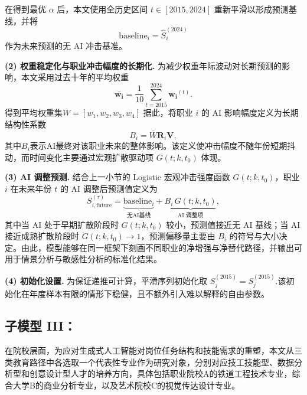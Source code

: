 \documentclass{mcmthesis}
\begin{document}
在得到最优 $\alpha$ 后，本文使用全历史区间 $t\in[2015,2024]$ 重新平滑以形成预测基线，并将
\begin{equation}
\mathrm{baseline}_{i}=\widehat{S}_i^{(2024)}
\end{equation}
作为未来预测的无 AI 冲击基准。

\noindent \textbf{(2) 权重稳定化与职业冲击幅度的长期化.}
为减少权重年际波动对长期预测的影响，本文采用过去十年的平均权重
\begin{equation}
\bar{\mathbf{w_i}}=\frac{1}{10}\sum_{t=2015}^{2024}\mathbf{w_i}^{(t)}.
\label{eq:wbar}
\end{equation}
得到平均权重集$\overline{W}=[w_1,w_2,w_3,w_4]$
据此，将职业 $i$ 的 AI 影响幅度定义为长期结构性系数
\begin{equation}
B_i={\overline{W}}\mathbf{R}_i\mathbf{V},
\label{eq:B_longrun}
\end{equation}
其中$B_i$表示AI最终对该职业未来的整体影响。该定义使冲击幅度不随年份短期抖动，而时间变化主要通过宏观扩散驱动项 $G(t;k,t_0)$ 体现。

\noindent \textbf{(3) AI 调整预测.}
结合上一小节的 Logistic 宏观冲击强度函数 $G(t;k,t_0)$，职业 $i$ 在未来年份 $t$ 的 AI 调整后预测值定义为
\begin{equation}
S_{i,\mathrm{future}}^{(\tau)}
=\underbrace{\mathrm{baseline}_{i}}_{\text{无AI基线}}
+\underbrace{B_i\,G(t;k,t_0)}_{\text{AI 调整项}},
\label{eq:ai_adjusted_forecast_cn}
\end{equation}
其中当 AI 处于早期扩散阶段时 $G(t;k,t_0)$ 较小，预测值接近无 AI 基线；当 AI 接近成熟扩散阶段时 $G(t;k,t_0)\to 1$，预测偏移量主要由 $B_i$ 的符号与大小决定。由此，模型能够在同一框架下刻画不同职业的净增强与净替代路径，并输出可用于情景分析与敏感性分析的标准化结果。

\noindent \textbf{(4) 初始化设置.}
为保证递推可计算，平滑序列初始化取
${S}_j^{(2015)}=S_j^{(2015)}.$该初始化在年度样本有限的情形下稳健，且不额外引入难以解释的自由参数。



\subsection{子模型 III：}
\noindent
在院校层面，为应对生成式人工智能对岗位任务结构和技能需求的重塑，本文从三类教育路径中各选取一个代表性专业作为研究对象，分别对应技工技能型、数据分析型和创意设计型人才的培养方向，具体包括职业院校A的铁道工程技术专业，综合大学B的商业分析专业，以及艺术院校C的视觉传达设计专业。
\end{document}
